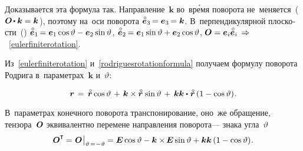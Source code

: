 \begin{otherlanguage}{russian}

\vspace{-0.1em}
Доказывается эта формула так.
Направление~${\bm{k}}$
во~вр\'{е}мя поворота
не~меняется~(${\rotationtensor \hspace{-0.2ex}\dotp \bm{k} = \bm{k}\hspace{.12ex}}$), поэтому на~оси поворота ${\mathcircabove{\bm{e}}_3 \hspace{-0.2ex} = \bm{e}_3 \hspace{-0.2ex} = \bm{k}}$.
В~перпендикулярной плоскости~() ${\mathcircabove{\bm{e}}_1 \hspace{-0.2ex} = \bm{e}_1 \cosine \vartheta - \bm{e}_2 \sine \vartheta}$, ${\mathcircabove{\bm{e}}_2 \hspace{-0.2ex} = \bm{e}_1 \sine \vartheta + \bm{e}_2 \cosine \vartheta}$, ${\rotationtensor = \bm{e}_i \mathcircabove{\bm{e}}_i \,\Rightarrow\hspace{.2ex}}$~\eqref{eulerfiniterotation}.



Из~\eqref{eulerfiniterotation} и~\eqref{rodriguesrotationformula} получаем формулу поворота Родрига в~параметрах~$\bm{k}$ и~$\vartheta$:

\nopagebreak\vspace{-0.3em}\begin{equation*}
\locationvector \hspace{.3ex}
= \hspace{.4ex} \initiallocationvector \cosine \vartheta \hspace{.3ex} + \hspace{.3ex} \bm{k} \times \initiallocationvector \hspace{.2ex} \sine \vartheta \hspace{.3ex} + \hspace{.4ex} \bm{k} \bm{k} \dotp \hspace{.1ex} \initiallocationvector \left({1 - \cosine \vartheta}\right)
\hspace{-0.25ex} .
\end{equation*}

\vspace{-0.2em}
В~параметрах конечного поворота транспонирование, оно~же обращение, тензора~$\bm{O}$ эквивалентно перемене направления поворота\:--- знака угла~$\vartheta$
\[
\rotationtensor^{\T} \hspace{-0.1ex}=\hspace{.1ex} \rotationtensor \hspace{.1ex} \bigr|_{\vartheta \,=\hspace{.1ex} -\vartheta} \hspace{-0.1ex} = \UnitDyad \cosine \vartheta - \bm{k} \times\hspace{-0.2ex} \UnitDyad \sine \vartheta + \bm{k} \bm{k} \left({1 - \cosine \vartheta}\right)
\hspace{-0.3ex} .
\]


\end{otherlanguage}

